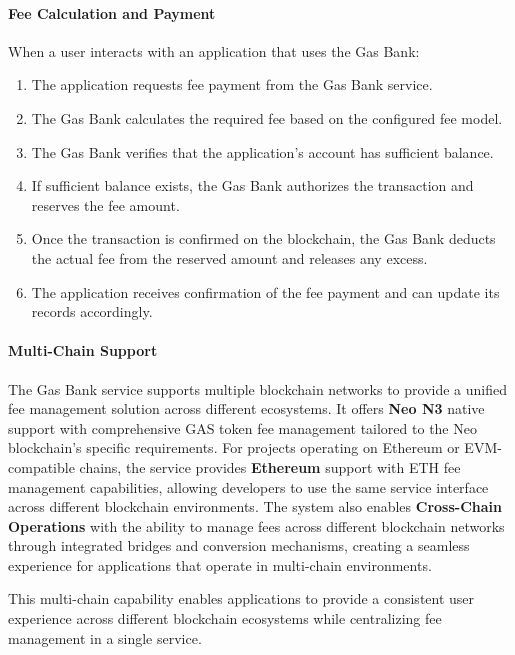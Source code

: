 \documentclass[11pt]{article}
\begin{document}


\paragraph{Fee Calculation and Payment}
When a user interacts with an application that uses the Gas Bank:

\begin{enumerate}
    \item The application requests fee payment from the Gas Bank service.
    \item The Gas Bank calculates the required fee based on the configured fee model.
    \item The Gas Bank verifies that the application's account has sufficient balance.
    \item If sufficient balance exists, the Gas Bank authorizes the transaction and reserves the fee amount.
    \item Once the transaction is confirmed on the blockchain, the Gas Bank deducts the actual fee from the reserved amount and releases any excess.
    \item The application receives confirmation of the fee payment and can update its records accordingly.
\end{enumerate}

\paragraph{Multi-Chain Support}
The Gas Bank service supports multiple blockchain networks to provide a unified fee management solution across different ecosystems. It offers \textbf{Neo N3} native support with comprehensive GAS token fee management tailored to the Neo blockchain's specific requirements. For projects operating on Ethereum or EVM-compatible chains, the service provides \textbf{Ethereum} support with ETH fee management capabilities, allowing developers to use the same service interface across different blockchain environments. The system also enables \textbf{Cross-Chain Operations} with the ability to manage fees across different blockchain networks through integrated bridges and conversion mechanisms, creating a seamless experience for applications that operate in multi-chain environments.

This multi-chain capability enables applications to provide a consistent user experience across different blockchain ecosystems while centralizing fee management in a single service.
\end{document}
